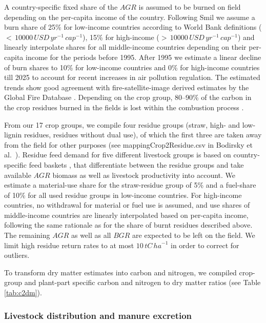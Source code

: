 \documentclass[gc, manuscript]{copernicus}
\begin{document}
A country-specific fixed share of the \(AGR\) is assumed to be burned on field depending on the per-capita income of the country. Following Smil \citeyearpar{smil_nitrogen_1999} we assume a burn share of 25\% for low-income countries according to World Bank definitions (\(<\,10000\,\unit{USD}\,\unit{yr}^{-1}\,\unit{cap}^{-1}\)), 15\% for high-income (\(>\,10000\,\unit{USD}\,\unit{yr}^{-1}\,\unit{cap}^{-1}\)) and linearly interpolate shares for all middle-income countries depending on their per-capita income for the periods before 1995. After 1995 we estimate a linear decline of burn shares to 10\% for low-income countries and 0\% for high-income countries till 2025 to account for recent increases in air pollution regulation. The estimated trends show good agreement with fire-satellite-image derived estimates by the Global Fire Database \citep{vanderWerf_fire_2017}. Depending on the crop group, 80--90\% of the carbon in the crop residues burned in the fields is lost within the combustion process \citep{eggleston_ipcc_2006}.

From our 17 crop groups, we compile four residue groups (straw, high- and low-lignin residues, residues without dual use), of which the first three are taken away from the field for other purposes (see mappingCrop2Residue.csv in Bodirsky et al.~\citeyearpar{bodirsky_mrcommons_2020}). Residue feed demand for five different livestock groups is based on country-specific feed baskets \citep[see][]{weindl_livestock_2017}, that differentiate between the residue groups and take available \(AGR\) biomass as well as livestock productivity into account. We estimate a material-use share for the straw-residue group of 5\% and a fuel-share of 10\% for all used residue groups in low-income countries. For high-income countries, no withdrawal for material or fuel use is assumed, and use shares of middle-income countries are linearly interpolated based on per-capita income, following the same rationale as for the share of burnt residues described above. The remaining \(AGR\) as well as all \(BGR\) are expected to be left on the field. We limit high residue return rates to at most \(10\,\unit{tC\,ha}^{-1}\) in order to correct for outliers.

To transform dry matter estimates into carbon and nitrogen, we compiled crop-group and plant-part specific carbon and nitrogen to dry matter ratios (see Table \ref{tab:c2dm}).

\hypertarget{sec:livstmanure}{%
\subsubsection{Livestock distribution and manure excretion}\label{sec:livstmanure}}
\end{document}
